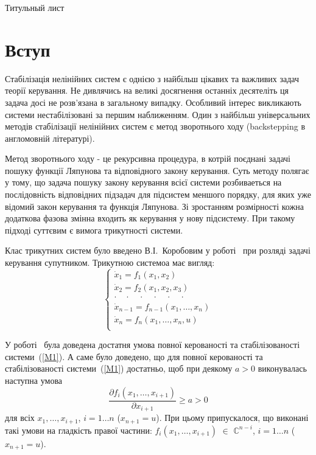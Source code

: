 \documentclass{article}
\begin{document}
Титульный лист
\pagebreak

\section{Вступ}

Стабілізація нелінійних систем є однією з найбільш цікавих та важливих задач теорії керування.
Не дивлячись на великі досягнення останніх десятеліть ця задача досі не розв'язана в 
загальному випадку. Особливий інтерес викликають системи нестабілізовані за першим
наближенням. Один з найбільш універсальних методів стабілізації нелінійних систем є метод зворотнього ходу 
(backstepping в англомовній літературі). 

Метод зворотнього ходу - це рекурсивна процедура, в котрій поєднані задачі пошуку функції Ляпунова та відповідного закону
керування. Суть методу полягає у тому, що задача пошуку закону керування всієї системи розбиваеться на послідовність
відповідних підзадач для підсистем меншого порядку, для яких уже відомий закон керування та функція Ляпунова.
Зі зростанням розмірності кожна додаткова фазова змінна входить як керування у нову підсистему. 
При такому підході суттєвим є вимога трикутності системи.

Клас трикутних систем було введено В.І.~Коробовим у роботі~\cite{?} при розляді задачі
керування супутником.
Трикутною системоа має вигляд: 
\begin{equation}\label{M1}
	\begin{cases}
        \dot x_1 = f_1(x_1, x_2)\\
        \dot x_2 = f_2(x_1, x_2 ,x_3)\\
        \cdot \quad \cdot \quad \cdot \quad \cdot \quad \cdot \quad \cdot \quad\\
        \dot x_{n-1} = f_{n-1}(x_1, \dots ,x_n)\\
        \dot x_{n} = f_{n}(x_1, \dots ,x_n,u)\\
	\end{cases}
\end{equation}

У роботі~\cite{?} була доведена достатня умова повної керованості та стабілізованості
системи~(\ref{M1}). А саме було доведено, що для повної керованості та стабілізованості
системи~(\ref{M1}) достатньо, щоб при деякому $a>0$ виконувалась наступна
умова 
\begin{equation}\label{M2}
    \frac{\partial f_i(x_1,\dots,x_{i+1})}{\partial x_{i+1}} \geq a > 0 
\end{equation} 
для всіх $x_1, \dots, x_{i+1}$, $i=1 \dots n $ ($x_{n+1} = u$). При цьому 
припускалося, що виконані такі умови на гладкість правої частини: 
$ f_i(x_1,\dots,x_{i+1})$ $\in$ $\mathbb{C}^{n-i}$, $i=1 \dots n $ ($x_{n+1} = u$).
\end{document}
